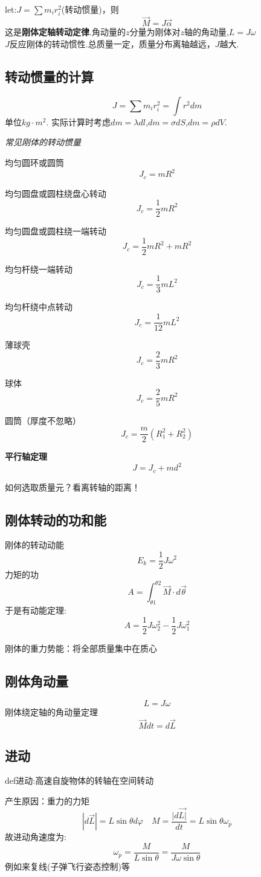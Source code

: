 \documentclass[10pt,a4paper]{article}
\begin{document}
let:$J=\sum m_ir_i^2$(转动惯量)，则
\[\boxed{\vec{M}=J\vec{\alpha}}\]这是\textbf{刚体定轴转动定律}.角动量的$z$分量为刚体对$z$轴的角动量,$\boxed{L=J\omega}$
\\$J$反应刚体的转动惯性.总质量一定，质量分布离轴越远，$J$越大.
\subsection{转动惯量的计算}
\[\boxed{J=\sum m_ir_i^2=\int r^2dm}\]单位$kg\cdot m^2$.
实际计算时考虑$dm=\lambda dl$,$dm=\sigma dS$,$dm=\rho dV$.

\textit{常见刚体的转动惯量}

均匀圆环或圆筒
\[J_c=mR^2\]

均匀圆盘或圆柱绕盘心转动
\[J_c=\frac{1}{2}mR^2\]

均匀圆盘或圆柱绕一端转动
\[J_c=\frac{1}{2}mR^2+mR^2\]

均匀杆绕一端转动
\[J_c=\frac{1}{3}mL^2\]

均匀杆绕中点转动
\[J_c=\frac{1}{12}mL^2\]

薄球壳
\[J_c=\frac{2}{3}mR^2\]

球体
\[J_c=\frac{2}{5}mR^2\]

圆筒（厚度不忽略）
\[J_c=\frac{m}{2}(R_1^2+R_2^2)\]

\textbf{平行轴定理}
\[\boxed{J=J_c+md^2}\]

如何选取质量元？看离转轴的距离！
\subsection{刚体转动的功和能}
刚体的转动动能
\[E_k=\frac{1}{2}J\omega^2\]
力矩的功
\[A=\int_{\theta 1}^{\theta 2}\vec{M}\cdot d\vec{\theta}\]
于是有动能定理:
\[A=\frac{1}{2}J\omega_2^2-\frac{1}{2}J\omega_1^2\]

刚体的重力势能：将全部质量集中在质心
\subsection{刚体角动量}
\[\boxed{L=J\omega}\]
刚体绕定轴的角动量定理
\[\vec{M}dt=d\vec{L}\]
\subsection{进动}
def进动:高速自旋物体的转轴在空间转动

产生原因：重力的力矩
\[|d\vec{L}|=L\sin\theta d\varphi \quad M=\frac{|d\vec{L|}}{dt}=L\sin\theta\omega_p\]
故进动角速度为:
\[\boxed{\omega_p=\frac{M}{L\sin\theta}=\frac{M}{J\omega\sin\theta}}\]
例如来复线(子弹飞行姿态控制)等
\end{document}

